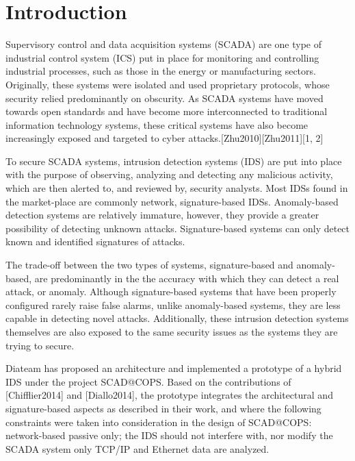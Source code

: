 \documentclass[12pt,]{article}
\begin{document}
\thispagestyle{empty} \newpage
\mbox{} \thispagestyle{empty}

\clearpage
\setcounter{page}{15} 

\section{Introduction}\label{introduction}

Supervisory control and data acquisition systems (SCADA) are one type of
industrial control system (ICS) put in place for monitoring and
controlling industrial processes, such as those in the energy or
manufacturing sectors. Originally, these systems were isolated and used
proprietary protocols, whose security relied predominantly on obscurity.
As SCADA systems have moved towards open standards and have become more
interconnected to traditional information technology systems, these
critical systems have also become increasingly exposed and targeted to
cyber attacks.{[}Zhu2010{]}{[}Zhu2011{]}{[}1, 2{]}

To secure SCADA systems, intrusion detection systems (IDS) are put into
place with the purpose of observing, analyzing and detecting any
malicious activity, which are then alerted to, and reviewed by, security
analysts. Most IDSs found in the market-place are commonly network,
signature-based IDSs. Anomaly-based detection systems are relatively
immature, however, they provide a greater possibility of detecting
unknown attacks. Signature-based systems can only detect known and
identified signatures of attacks.

The trade-off between the two types of systems, signature-based and
anomaly-based, are predominantly in the the accuracy with which they can
detect a real attack, or anomaly. Although signature-based systems that
have been properly configured rarely raise false alarms, unlike
anomaly-based systems, they are less capable in detecting novel attacks.
Additionally, these intrusion detection systems themselves are also
exposed to the same security issues as the systems they are trying to
secure.

Diateam has proposed an architecture and implemented a prototype of a
hybrid IDS under the project SCAD@COPS. Based on the contributions of
{[}Chifflier2014{]} and {[}Diallo2014{]}, the prototype integrates the
architectural and signature-based aspects as described in their work,
and where the following constraints were taken into consideration in the
design of SCAD@COPS: network-based passive only; the IDS should not
interfere with, nor modify the SCADA system only TCP/IP and Ethernet
data are analyzed.
\end{document}
